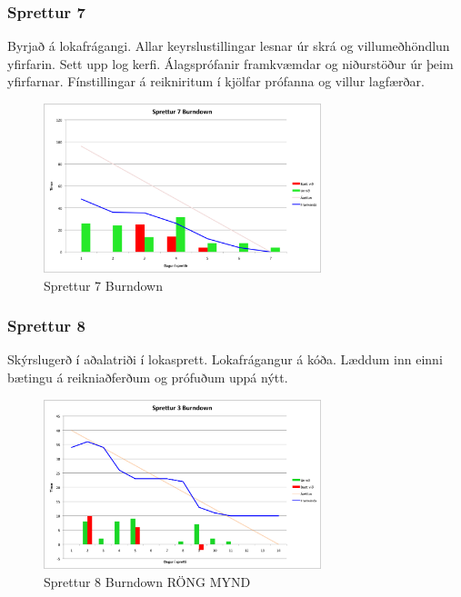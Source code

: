 \documentclass{article}
\begin{document}
\subsubsection{Sprettur 7}
Byrjað á lokafrágangi. Allar keyrslustillingar lesnar úr skrá og villumeðhöndlun
yfirfarin. Sett upp log kerfi. Álagsprófanir framkvæmdar og 
niðurstöður úr þeim yfirfarnar. Fínstillingar á reikniritum í kjölfar prófanna
og villur lagfærðar. 

\begin{figure}[H]
 \centering
 \includegraphics[width=0.72\textwidth]{Sprettur7_Burndown.png}
 \caption{Sprettur 7 Burndown}
\end{figure}

\subsubsection{Sprettur 8}
Skýrslugerð í aðalatriði í lokasprett. Lokafrágangur á kóða. Læddum inn einni
bætingu á reikniaðferðum og prófuðum uppá nýtt.
\begin{figure}[H]
 \centering
 \includegraphics[width=0.72\textwidth]{Sprettur3_Burndown.png}
 \caption{Sprettur 8 Burndown RÖNG MYND}
\end{figure}

\hfil \\
\hfil \\
\hfil \\
\hfil \\
\end{document}
